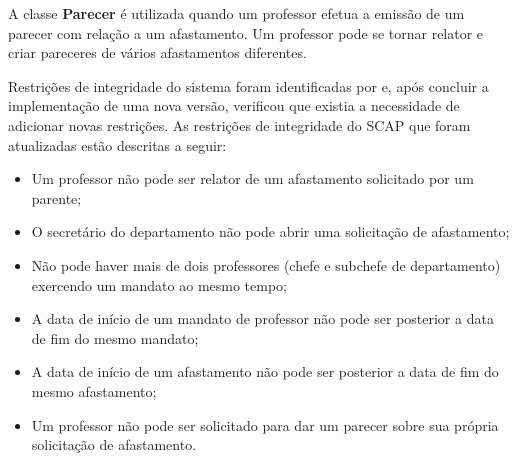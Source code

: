 A classe \textbf{Parecer} é utilizada quando um professor efetua a emissão de um parecer com relação a um afastamento. Um professor pode se tornar relator e criar pareceres de vários afastamentos diferentes. 

Restrições de integridade do sistema foram identificadas por  e, após concluir a implementação de uma nova versão,  verificou que existia a necessidade de adicionar novas restrições. As restrições de integridade do SCAP que foram atualizadas estão descritas a seguir:
 
\begin{itemize}

	\item Um professor não pode ser relator de um afastamento solicitado por um parente;
	
	\item O secretário do departamento não pode abrir uma solicitação de afastamento;
	
	\item Não pode haver mais de dois professores (chefe e subchefe de departamento) exercendo um mandato ao mesmo tempo;
	
	\item A data de início de um mandato de professor não pode ser posterior a data de fim do mesmo mandato;
	
	\item A data de início de um afastamento não pode ser posterior a data de fim do mesmo afastamento;
	
	\item Um professor não pode ser solicitado para dar um parecer sobre sua própria solicitação de afastamento. 
   
\end{itemize} 
